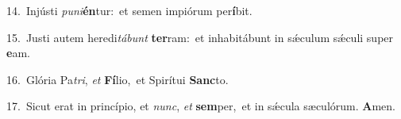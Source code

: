 {\numbfont\textcolor{\numbcolor}{14.}}~Injústi \textit{pu}\-\textit{ni}\textbf{én}tur:~\star et semen impiórum per\-\textbf{í}\-bit.\par
{\numbfont\textcolor{\numbcolor}{15.}}~Justi autem heredi\-\textit{tá}\-\textit{bunt} \textbf{ter}\-ram:~\star et inhabitábunt in sǽculum sǽculi super \textbf{e}\-am.\par
{\numbfont\textcolor{\numbcolor}{16.}}~Glória Pa\-\textit{tri}\-, \textit{et} \textbf{Fí}\-lio,~\star et Spirítui \textbf{Sanc}\-to.\par
{\numbfont\textcolor{\numbcolor}{17.}}~Sicut erat in princípio, et \textit{nunc}\-, \textit{et} \textbf{sem}\-per,~\star et in sǽcula sæculórum. \textbf{A}\-men.\par
